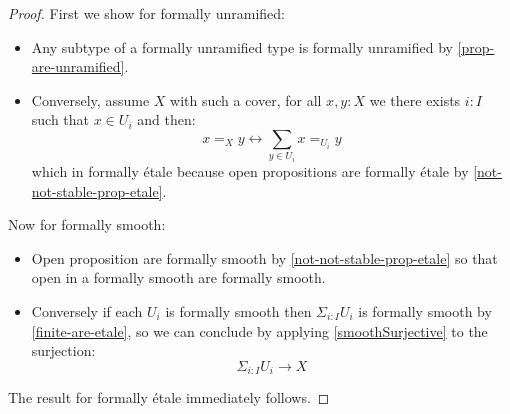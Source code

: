 \begin{proof}
First we show for formally unramified:
\begin{itemize}
\item Any subtype of a formally unramified type is formally unramified by \cref{prop-are-unramified}.
\item Conversely, assume $X$ with such a cover, for all $x,y:X$ we there exists $i:I$ such that $x\in U_i$ and then:
\[x=_Xy \leftrightarrow \sum_{y\in U_i} x=_{U_i}y \]
which in formally étale because open propositions are formally étale by \cref{not-not-stable-prop-etale}.
\end{itemize}
Now for formally smooth:
\begin{itemize}
\item Open proposition are formally smooth by \cref{not-not-stable-prop-etale} so that open in a formally smooth are formally smooth.
\item Conversely if each $U_i$ is formally smooth then $\Sigma_{i:I}U_i$ is formally smooth by \cref{finite-are-etale}, so we can conclude by applying \cref{smoothSurjective} to the surjection:
\[\Sigma_{i:I}U_i \to X\]
\end{itemize}
The result for formally étale immediately follows.
\end{proof}




